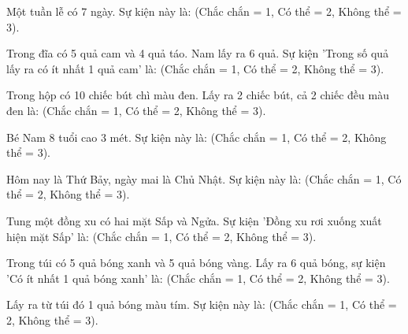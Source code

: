 \begin{ex}
Một tuần lễ có 7 ngày. Sự kiện này là: (Chắc chắn = 1, Có thể = 2, Không thể = 3).
\end{ex}

\begin{ex}
Trong đĩa có 5 quả cam và 4 quả táo. Nam lấy ra 6 quả. Sự kiện 'Trong số quả lấy ra có ít nhất 1 quả cam' là: (Chắc chắn = 1, Có thể = 2, Không thể = 3).
\end{ex}

\begin{ex}
Trong hộp có 10 chiếc bút chì màu đen. Lấy ra 2 chiếc bút, cả 2 chiếc đều màu đen là: (Chắc chắn = 1, Có thể = 2, Không thể = 3).
\end{ex}

\begin{ex}
Bé Nam 8 tuổi cao 3 mét. Sự kiện này là: (Chắc chắn = 1, Có thể = 2, Không thể = 3).
\end{ex}

\begin{ex}
Hôm nay là Thứ Bảy, ngày mai là Chủ Nhật. Sự kiện này là: (Chắc chắn = 1, Có thể = 2, Không thể = 3).
\end{ex}

\begin{ex}
Tung một đồng xu có hai mặt Sấp và Ngửa. Sự kiện 'Đồng xu rơi xuống xuất hiện mặt Sấp' là: (Chắc chắn = 1, Có thể = 2, Không thể = 3).
\end{ex}

\begin{ex}
Trong túi có 5 quả bóng xanh và 5 quả bóng vàng. Lấy ra 6 quả bóng, sự kiện 'Có ít nhất 1 quả bóng xanh' là: (Chắc chắn = 1, Có thể = 2, Không thể = 3).
\end{ex}

\begin{ex}
Lấy ra từ túi đó 1 quả bóng màu tím. Sự kiện này là: (Chắc chắn = 1, Có thể = 2, Không thể = 3).
\end{ex}

